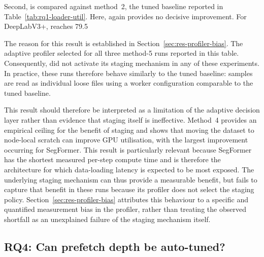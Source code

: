 Second, \pads{} is compared against method~2, the tuned baseline reported in Table~\ref{tab:rq1-loader-util}. Here, \pads{} again provides no decisive improvement. For DeepLabV3+, \pads{} reaches 79.5%

The reason for this result is established in Section~\ref{sec:res-profiler-bias}. The adaptive profiler selected  for all three method-5 runs reported in this table. Consequently, \pads{} did not activate its staging mechanism in any of these experiments. In practice, these runs therefore behave similarly to the tuned baseline: samples are read as individual loose files using a worker configuration comparable to the tuned baseline.

This result should therefore be interpreted as a limitation of the adaptive decision layer rather than evidence that staging itself is ineffective. Method~4 provides an empirical ceiling for the benefit of staging and shows that moving the dataset to node-local scratch can improve GPU utilisation, with the largest improvement occurring for SegFormer. This result is particularly relevant because SegFormer has the shortest measured per-step compute time and is therefore the architecture for which data-loading latency is expected to be most exposed. The underlying staging mechanism can thus provide a measurable benefit, but \pads{} fails to capture that benefit in these runs because its profiler does not select the staging policy. Section~\ref{sec:res-profiler-bias} attributes this behaviour to a specific and quantified measurement bias in the profiler, rather than treating the observed shortfall as an unexplained failure of the staging mechanism itself.


\subsection{RQ4: Can prefetch depth be auto-tuned?}
\label{sec:res-rq4}

